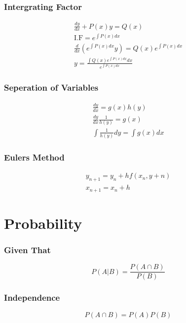 \documentclass{article}
\begin{document}
        \subsubsection{Intergrating Factor}
        \begin{gather}
            \frac {dy} {dx} + P(x)y = Q(x) \\
            \textrm{I.F} = e^{\int P(x) dx} \\
            \frac d {dx} (e^{\int P(x) dx}y) = Q(x)e^{\int P(x) dx} \\
            y = \frac {\int Q(x)e^{\int P(x) dx}dx} {e^{\int P(x) dx}}
        \end{gather}

        \subsubsection{Seperation of Variables}
        \begin{gather}
            \frac {dy} {dx} = g(x)h(y) \\
            \frac {dy} {dx} \frac 1 {h(y)} = g(x) \\
            \int \frac 1 {h(y)} dy = \int g(x) dx
        \end{gather}

        \subsubsection{Eulers Method}
        \begin{gather}
            y_{n+1} = y_n + hf(x_n, y+n) \\
            x_{n+1} = x_n + h
        \end{gather}
        

    \section{Probability}

    \subsubsection{Given That}
    \begin{equation}
        P(A | B) = \frac {P(A \cap B)} {P(B)}
    \end{equation}

    \subsubsection{Independence}
    \begin{equation}
        P(A \cap B) = P(A)P(B)
    \end{equation}
\end{document}
